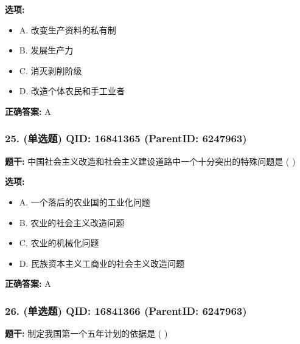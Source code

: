 \documentclass[12pt,UTF8]{ctexart}
\begin{document}
\textbf{选项:}
\begin{itemize}[leftmargin=*]

  \item A. 改变生产资料的私有制

  \item B. 发展生产力

  \item C. 消灭剥削阶级

  \item D. 改造个体农民和手工业者

\end{itemize}

\textbf{正确答案:}
A

\vspace{0.3em}\hrulefill\vspace{0.7em}

\subsubsection*{25. (单选题) \small QID: 16841365 (ParentID: 6247963)}

\textbf{题干:}
中国社会主义改造和社会主义建设道路中一个十分突出的特殊问题是 ( )



\textbf{选项:}
\begin{itemize}[leftmargin=*]

  \item A. 一个落后的农业国的工业化问题

  \item B. 农业的社会主义改造问题

  \item C. 农业的机械化问题

  \item D. 民族资本主义工商业的社会主义改造问题

\end{itemize}

\textbf{正确答案:}
A

\vspace{0.3em}\hrulefill\vspace{0.7em}

\subsubsection*{26. (单选题) \small QID: 16841366 (ParentID: 6247963)}

\textbf{题干:}
制定我国第一个五年计划的依据是 ( )
\end{document}

